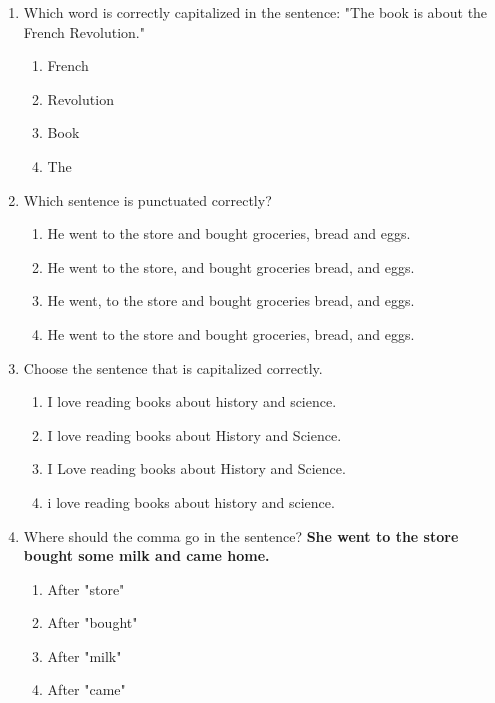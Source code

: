 \documentclass[12pt]{article}
\begin{document}
\begin{enumerate}
\vspace{0.5cm}

\item Which word is correctly capitalized in the sentence: "The book is about the French Revolution."
\begin{enumerate}[label=\Alph*.]
    \item French
    \item Revolution
    \item Book
    \item The
\end{enumerate}

\vspace{0.5cm}

\item Which sentence is punctuated correctly?
\begin{enumerate}[label=\Alph*.]
    \item He went to the store and bought groceries, bread and eggs.
    \item He went to the store, and bought groceries bread, and eggs.
    \item He went, to the store and bought groceries bread, and eggs.
    \item He went to the store and bought groceries, bread, and eggs.
\end{enumerate}

\vspace{0.5cm}

\item Choose the sentence that is capitalized correctly.
\begin{enumerate}[label=\Alph*.]
    \item I love reading books about history and science.
    \item I love reading books about History and Science.
    \item I Love reading books about History and Science.
    \item i love reading books about history and science.
\end{enumerate}

\vspace{0.5cm}

\item Where should the comma go in the sentence?
\textbf{She went to the store bought some milk and came home.}
\begin{enumerate}[label=\Alph*.]
    \item After "store"
    \item After "bought"
    \item After "milk"
    \item After "came"
\end{enumerate}


\end{enumerate}
\end{document}
